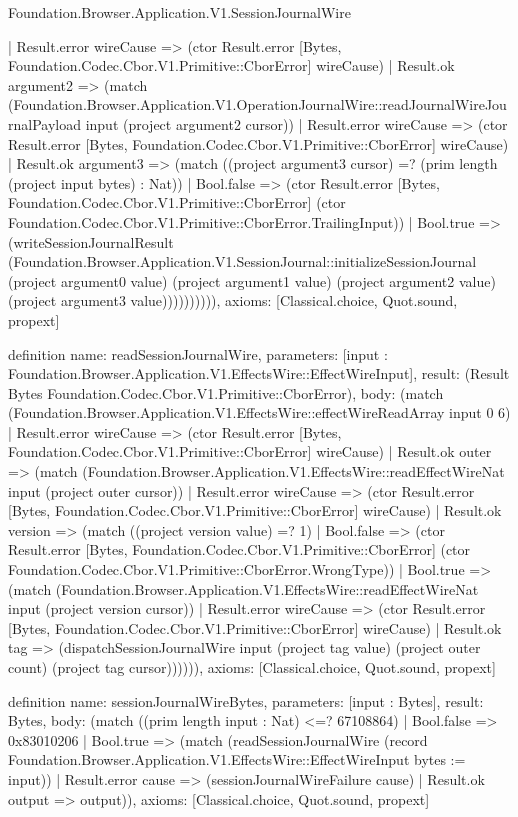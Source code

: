 \begin{lexlean}{Foundation.Browser.Application.V1.SessionJournalWire}
\begin{semanticmodule}
{            | Result.error wireCause => (ctor Result.error [Bytes, Foundation.Codec.Cbor.V1.Primitive::CborError] wireCause)
            | Result.ok argument2 => (match (Foundation.Browser.Application.V1.OperationJournalWire::readJournalWireJournalPayload input (project argument2 cursor))
              | Result.error wireCause => (ctor Result.error [Bytes, Foundation.Codec.Cbor.V1.Primitive::CborError] wireCause)
              | Result.ok argument3 => (match ((project argument3 cursor) =? (prim length (project input bytes) : Nat))
                | Bool.false => (ctor Result.error [Bytes, Foundation.Codec.Cbor.V1.Primitive::CborError] (ctor Foundation.Codec.Cbor.V1.Primitive::CborError.TrailingInput))
                | Bool.true => (writeSessionJournalResult (Foundation.Browser.Application.V1.SessionJournal::initializeSessionJournal (project argument0 value) (project argument1 value) (project argument2 value) (project argument3 value)))))))))),
  axioms: [Classical.choice, Quot.sound, propext]
}

definition{
  name: readSessionJournalWire,
  parameters: [input : Foundation.Browser.Application.V1.EffectsWire::EffectWireInput],
  result: (Result Bytes Foundation.Codec.Cbor.V1.Primitive::CborError),
  body: (match (Foundation.Browser.Application.V1.EffectsWire::effectWireReadArray input 0 6)
    | Result.error wireCause => (ctor Result.error [Bytes, Foundation.Codec.Cbor.V1.Primitive::CborError] wireCause)
    | Result.ok outer => (match (Foundation.Browser.Application.V1.EffectsWire::readEffectWireNat input (project outer cursor))
      | Result.error wireCause => (ctor Result.error [Bytes, Foundation.Codec.Cbor.V1.Primitive::CborError] wireCause)
      | Result.ok version => (match ((project version value) =? 1)
        | Bool.false => (ctor Result.error [Bytes, Foundation.Codec.Cbor.V1.Primitive::CborError] (ctor Foundation.Codec.Cbor.V1.Primitive::CborError.WrongType))
        | Bool.true => (match (Foundation.Browser.Application.V1.EffectsWire::readEffectWireNat input (project version cursor))
          | Result.error wireCause => (ctor Result.error [Bytes, Foundation.Codec.Cbor.V1.Primitive::CborError] wireCause)
          | Result.ok tag => (dispatchSessionJournalWire input (project tag value) (project outer count) (project tag cursor)))))),
  axioms: [Classical.choice, Quot.sound, propext]
}

definition{
  name: sessionJournalWireBytes,
  parameters: [input : Bytes],
  result: Bytes,
  body: (match ((prim length input : Nat) <=? 67108864)
    | Bool.false => 0x83010206
    | Bool.true => (match (readSessionJournalWire (record Foundation.Browser.Application.V1.EffectsWire::EffectWireInput {bytes := input}))
      | Result.error cause => (sessionJournalWireFailure cause)
      | Result.ok output => output)),
  axioms: [Classical.choice, Quot.sound, propext]
}
\end{semanticmodule}
\end{lexlean}
